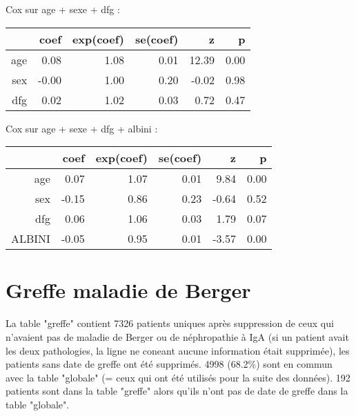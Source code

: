 \documentclass[11pt,a4paper]{article}\usepackage[]{graphicx}\usepackage[]{color}
\begin{document}
Cox sur age + sexe + dfg :
\begin{table}[H]
\centering
\begin{tabular}{rrrrrr}
  \hline
 & coef & exp(coef) & se(coef) & z & p \\ 
  \hline
age & 0.08 & 1.08 & 0.01 & 12.39 & 0.00 \\ 
  sex & -0.00 & 1.00 & 0.20 & -0.02 & 0.98 \\ 
  dfg & 0.02 & 1.02 & 0.03 & 0.72 & 0.47 \\ 
   \hline
\end{tabular}
\end{table}


Cox sur age + sexe + dfg + albini :
\begin{table}[H]
\centering
\begin{tabular}{rrrrrr}
  \hline
 & coef & exp(coef) & se(coef) & z & p \\ 
  \hline
age & 0.07 & 1.07 & 0.01 & 9.84 & 0.00 \\ 
  sex & -0.15 & 0.86 & 0.23 & -0.64 & 0.52 \\ 
  dfg & 0.06 & 1.06 & 0.03 & 1.79 & 0.07 \\ 
  ALBINI & -0.05 & 0.95 & 0.01 & -3.57 & 0.00 \\ 
   \hline
\end{tabular}
\end{table}


  
\section{Greffe maladie de Berger}




La table "greffe" contient 7326 patients uniques après suppression de ceux qui n'avaient pas de maladie de Berger ou de néphropathie à IgA (si un patient avait les deux pathologies, la ligne ne coneant aucune information était supprimée), les patients sans date de greffe ont été supprimés. 4998 (68.2\%) sont en commun avec la table "globale" (= ceux qui ont été utilisés pour la suite des données). 192 patients sont dans la table "greffe" alors qu'ils n'ont pas de date de greffe dans la table "globale".
~\\
\end{document}

